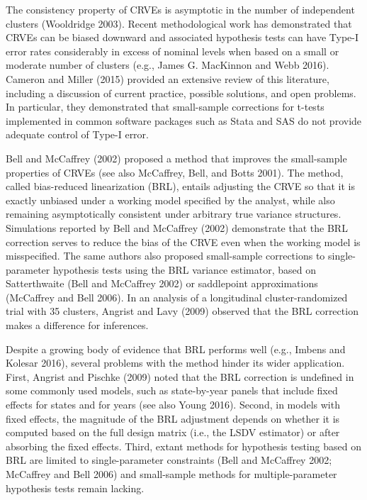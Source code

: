 \documentclass[12pt]{article}
\begin{document}
The consistency property of CRVEs is asymptotic in the number of
independent clusters (Wooldridge 2003). Recent methodological work has
demonstrated that CRVEs can be biased downward and associated hypothesis
tests can have Type-I error rates considerably in excess of nominal
levels when based on a small or moderate number of clusters (e.g., James
G. MacKinnon and Webb 2016). Cameron and Miller (2015) provided an
extensive review of this literature, including a discussion of current
practice, possible solutions, and open problems. In particular, they
demonstrated that small-sample corrections for t-tests implemented in
common software packages such as Stata and SAS do not provide adequate
control of Type-I error.

Bell and McCaffrey (2002) proposed a method that improves the
small-sample properties of CRVEs (see also McCaffrey, Bell, and Botts
2001). The method, called bias-reduced linearization (BRL), entails
adjusting the CRVE so that it is exactly unbiased under a working model
specified by the analyst, while also remaining asymptotically consistent
under arbitrary true variance structures. Simulations reported by Bell
and McCaffrey (2002) demonstrate that the BRL correction serves to
reduce the bias of the CRVE even when the working model is misspecified.
The same authors also proposed small-sample corrections to
single-parameter hypothesis tests using the BRL variance estimator,
based on Satterthwaite (Bell and McCaffrey 2002) or saddlepoint
approximations (McCaffrey and Bell 2006). In an analysis of a
longitudinal cluster-randomized trial with 35 clusters, Angrist and Lavy
(2009) observed that the BRL correction makes a difference for
inferences.

Despite a growing body of evidence that BRL performs well (e.g., Imbens
and Kolesar 2016), several problems with the method hinder its wider
application. First, Angrist and Pischke (2009) noted that the BRL
correction is undefined in some commonly used models, such as
state-by-year panels that include fixed effects for states and for years
(see also Young 2016). Second, in models with fixed effects, the
magnitude of the BRL adjustment depends on whether it is computed based
on the full design matrix (i.e., the LSDV estimator) or after absorbing
the fixed effects. Third, extant methods for hypothesis testing based on
BRL are limited to single-parameter constraints (Bell and McCaffrey
2002; McCaffrey and Bell 2006) and small-sample methods for
multiple-parameter hypothesis tests remain lacking.
\end{document}
